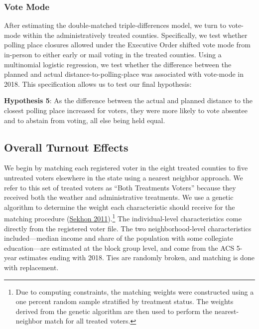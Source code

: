 \documentclass[
  12pt,
]{article}
\begin{document}
\hypertarget{vote-mode}{%
\subsubsection*{Vote Mode}\label{vote-mode}}

After estimating the double-matched triple-differences model, we turn to vote-mode within the administratively treated counties. Specifically, we test whether polling place closures allowed under the Executive Order shifted vote mode from in-person to either early or mail voting in the treated counties. Using a multinomial logistic regression, we test whether the difference between the planned and actual distance-to-polling-place was associated with vote-mode in 2018. This specification allows us to test our final hypothesis:

\textbf{Hypothesis 5}: As the difference between the actual and planned distance to the closest polling place increased for voters, they were more likely to vote absentee and to abstain from voting, all else being held equal.

\hypertarget{overall-turnout-effects}{%
\subsection*{Overall Turnout Effects}\label{overall-turnout-effects}}

We begin by matching each registered voter in the eight treated counties to five untreated voters elsewhere in the state using a nearest neighbor approach. We refer to this set of treated voters as ``Both Treatments Voters'' because they received both the weather and administrative treatments. We use a genetic algorithm to determine the weight each characteristic should receive for the matching procedure (\protect\hyperlink{ref-Sekhon2011}{Sekhon 2011}).\footnote{Due to computing constraints, the matching weights were constructed using a one percent random sample stratified by treatment status. The weights derived from the genetic algorithm are then used to perform the nearest-neighbor match for all treated voters.} The individual-level characteristics come directly from the registered voter file. The two neighborhood-level characteristics included---median income and share of the population with some collegiate education---are estimated at the block group level, and come from the ACS 5-year estimates ending with 2018. Ties are randomly broken, and matching is done with replacement.
\end{document}
